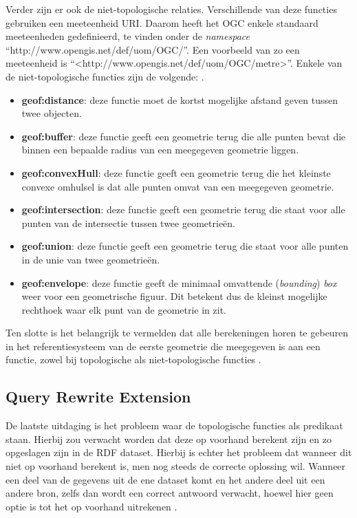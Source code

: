 Verder zijn er ook de niet-topologische relaties. Verschillende van deze functies gebruiken een meeteenheid URI. Daarom heeft het OGC enkele standaard meeteenheden gedefinieerd, te vinden onder de \textit{namespace} ``http://www.opengis.net/def/uom/OGC/''. Een voorbeeld van zo een meeteenheid is ``<http://www.opengis.net/def/uom/OGC/metre>''. Enkele van de niet-topologische functies zijn de volgende: \cite{ogcdocs}.

\begin{itemize}
    \item \textbf{geof:distance}: deze functie moet de kortst mogelijke afstand geven tussen twee objecten.
    \item \textbf{geof:buffer}: deze functie geeft een geometrie terug die alle punten bevat die binnen een bepaalde radius van een meegegeven geometrie liggen.
    \item \textbf{geof:convexHull}: deze functie geeft een geometrie terug die het kleinste convexe omhulsel is dat alle punten omvat van een meegegeven geometrie.
    \item \textbf{geof:intersection}: deze functie geeft een geometrie terug die staat voor alle punten van de intersectie tussen twee geometrieën.
    \item \textbf{geof:union}: deze functie geeft een geometrie terug die staat voor alle punten in de unie van twee geometrieën.
    \item \textbf{geof:envelope}: deze functie geeft de minimaal omvattende (\textit{bounding}) \textit{box} weer voor een geometrische figuur. Dit betekent dus de kleinst mogelijke rechthoek waar elk punt van de geometrie in zit.
    
\end{itemize}

Ten slotte is het belangrijk te vermelden dat alle berekeningen horen te gebeuren in het referentiesysteem van de eerste geometrie die meegegeven is aan een functie, zowel bij topologische als niet-topologische functies \cite{ogcdocs}.


\subsection{Query Rewrite Extension}
\label{subsec:geosparql_rewrite_query}
De laatste uitdaging is het probleem waar de topologische functies als predikaat staan. Hierbij zou verwacht worden dat deze op voorhand berekent zijn en zo opgeslagen zijn in de RDF dataset. Hierbij is echter het probleem dat wanneer dit niet op voorhand berekent is, men nog steeds de correcte oplossing wil. Wanneer een deel van de gegevens uit de ene dataset komt en het andere deel uit een andere bron, zelfs dan wordt een correct antwoord verwacht, hoewel hier geen optie is tot het op voorhand uitrekenen \cite{ogcdocs}. 

